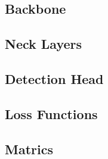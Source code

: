 \documentclass[a4paper]{article}
\begin{document}
\subsection{Backbone}

\subsection{Neck Layers}

\subsection{Detection Head}

\subsection{Loss Functions}

\subsection{Matrics}




\end{document}
